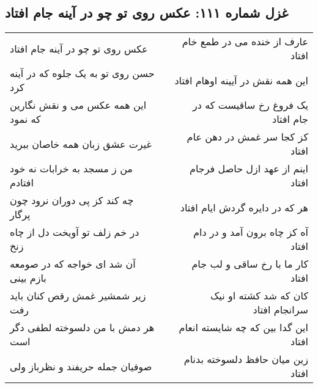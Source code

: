 \begin{center}
\section*{غزل شماره ۱۱۱: عکس روی تو چو در آینه جام افتاد}
\label{sec:sh111}
\begin{longtable}{l p{0.5cm} r}
عکس روی تو چو در آینه جام افتاد
&&
عارف از خنده می در طمع خام افتاد
\\
حسن روی تو به یک جلوه که در آینه کرد
&&
این همه نقش در آیینه اوهام افتاد
\\
این همه عکس می و نقش نگارین که نمود
&&
یک فروغ رخ ساقیست که در جام افتاد
\\
غیرت عشق زبان همه خاصان ببرید
&&
کز کجا سر غمش در دهن عام افتاد
\\
من ز مسجد به خرابات نه خود افتادم
&&
اینم از عهد ازل حاصل فرجام افتاد
\\
چه کند کز پی دوران نرود چون پرگار
&&
هر که در دایره گردش ایام افتاد
\\
در خم زلف تو آویخت دل از چاه زنخ
&&
آه کز چاه برون آمد و در دام افتاد
\\
آن شد ای خواجه که در صومعه بازم بینی
&&
کار ما با رخ ساقی و لب جام افتاد
\\
زیر شمشیر غمش رقص کنان باید رفت
&&
کان که شد کشته او نیک سرانجام افتاد
\\
هر دمش با من دلسوخته لطفی دگر است
&&
این گدا بین که چه شایسته انعام افتاد
\\
صوفیان جمله حریفند و نظرباز ولی
&&
زین میان حافظ دلسوخته بدنام افتاد
\\
\end{longtable}
\end{center}
